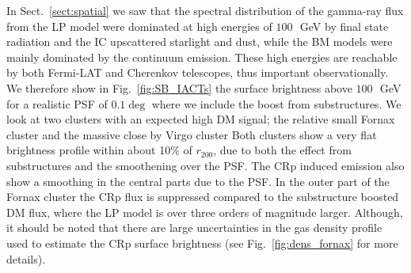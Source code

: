 \documentclass[10pt,aps,pra,reprint,amsmath,amsfonts,amssymb,showpacs]{revtex4-1}
\newcommand{\rvir}{r_{200}}
\begin{document}
In Sect.~\ref{sect:spatial} we saw that the spectral distribution of
the gamma-ray flux from the LP model were dominated at high energies
of $100\,$~GeV by final state radiation and the IC upscattered
starlight and dust, while the BM models were mainly dominated by the
continuum emission. These high energies are reachable by both
Fermi-LAT and Cherenkov telescopes, thus important observationally. We
therefore show in Fig.~\ref{fig:SB_IACTs} the surface brightness above
$100\,$~GeV for a realistic PSF of $0.1\deg$ where we include the
boost from substructures. We look at two clusters with an expected
high DM signal; the relative small Fornax cluster and the massive
close by Virgo cluster Both clusters show a very flat brightness
profile within about 10\% of $\rvir$, due to both the effect from
substructures and the smoothening over the PSF. The CRp induced
emission also show a smoothing in the central parts due to the PSF. In
the outer part of the Fornax cluster the CRp flux is suppressed
compared to the substructure boosted DM flux, where the LP model is
over three orders of magnitude larger. Although, it should be noted
that there are large uncertainties in the gas density profile used to
estimate the CRp surface brightness (see Fig.~\ref{fig:dens_fornax}
for more details).
\end{document}
